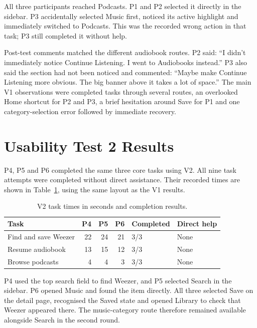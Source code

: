 All three participants reached Podcasts. P1 and P2 selected it directly in
the sidebar. P3 accidentally selected Music first, noticed its active
highlight and immediately switched to Podcasts. This was the recorded
wrong action in that task; P3 still completed it without help.

Post-test comments matched the different audiobook routes. P2 said:
``I didn't immediately notice Continue Listening. I went to Audiobooks
instead.'' P3 also said the section had not been noticed and commented:
``Maybe make Continue Listening more obvious. The big banner above it takes
a lot of space.'' The main V1 observations were completed tasks through
several routes, an overlooked Home shortcut for P2 and P3, a brief hesitation
around Save for P1 and one category-selection error followed by immediate
recovery.

\section{Usability Test 2 Results}
\label{sec:results-v2}

P4, P5 and P6 completed the same three core tasks using V2. All nine task
attempts were completed without direct assistance. Their recorded times
are shown in Table~\ref{tab:results-v2}, using the same layout as the V1
results.

\begin{table}[!htbp]
  \centering
  \caption{V2 task times in seconds and completion results.}
  \label{tab:results-v2}
  \begingroup
  \small
  \renewcommand{\arraystretch}{1.3}
  \begin{tabular}{@{}p{}rrrp{}l@{}}
    \hline
    \textbf{Task} & \textbf{P4} & \textbf{P5} & \textbf{P6} &
    \textbf{Completed} & \textbf{Direct help} \\
    \hline
    Find and save Weezer & 22 & 24 & 21 & 3/3 & None \\
    Resume audiobook & 13 & 15 & 12 & 3/3 & None \\
    Browse podcasts & 4 & 4 & 3 & 3/3 & None \\
    \hline
  \end{tabular}
  \endgroup
\end{table}

P4 used the top search field to find Weezer, and P5 selected Search in the
sidebar. P6 opened Music and found the item directly. All three selected
Save on the detail page, recognised the Saved state and opened Library to
check that Weezer appeared there. The music-category route therefore
remained available alongside Search in the second round.

